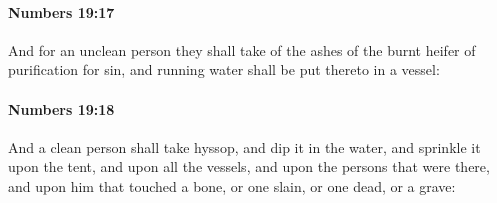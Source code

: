 		\paragraph{Numbers 19:17} %
			\label{NUMBERS-19-17}

			And for an unclean person they shall take of the ashes of the burnt heifer of purification for sin, and running water shall be put thereto in a vessel:


		\paragraph{Numbers 19:18} %
			\label{NUMBERS-19-18}

			And a clean person shall take hyssop, and dip it in the water, and sprinkle it upon the tent, and upon all the vessels, and upon the persons that were there, and upon him that touched a bone, or one slain, or one dead, or a grave:


